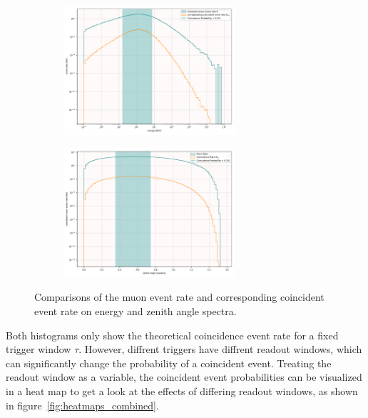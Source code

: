 \begin{figure}[ht]
    \centering
    \begin{subfigure}[b]{\textwidth}
        \centering
        \includegraphics[width=0.7\textwidth]{Plots/coincidence_rate_energy.pdf}
    \end{subfigure}
    \vspace{1em} %
    \begin{subfigure}[b]{\textwidth}
        \centering
        \includegraphics[width=0.7\textwidth]{Plots/coincidence_rate_zenith.pdf}
    \end{subfigure}
    \caption{Comparisons of the muon event rate and corresponding coincident event rate on energy and zenith angle spectra.}
    \label{fig:coin_rate_combined}
\end{figure}


Both histograms only show the theoretical coincidence event rate for a fixed trigger window $\tau$. However, diffrent triggers have diffrent readout windows, which 
can significantly change the probability of a coincident event. Treating the readout window as a variable, the coincident event probabilities can be visualized in 
a heat map to get a look at the effects of differing readout windows, as shown in figure~\ref{fig:heatmaps_combined}.

